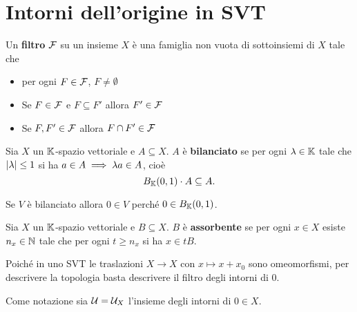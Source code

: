 \section{Intorni dell'origine in SVT}

\begin{definition}[Filtro]
Un \textbf{filtro} $\mathcal{F}$ su un insieme $X$ \`e una famiglia non vuota di sottoinsiemi di $X$ tale che
\begin{itemize}
    \item per ogni $F\in\mathcal{F}$, $F\neq \emptyset$
    \item Se $F\in \mathcal{F}$ e $F\subseteq F'$ allora $F'\in\mathcal{F}$
    \item Se $F,F'\in\mathcal{F}$ allora $F\cap F'\in\mathcal{F}$
\end{itemize}
\end{definition}

\begin{definition}
Sia $X$ un $\mathbb{K}$-spazio vettoriale e $A\subseteq X$. $A$ \`e \textbf{bilanciato} se per ogni $\lambda\in\mathbb{K}$ tale che $\left|{\lambda}\right|\leq1$ si ha $a\in A\implies \lambda a\in A$, cio\`e 
\[B_{\mathbb{K}}(0,1)\cdot A\subseteq A.\]
\end{definition}

\begin{remark}
Se $V$ \`e bilanciato allora $0\in V$ perch\'e $0\in B_{\mathbb{K}}(0,1)$.
\end{remark}

\begin{definition}
Sia $X$ un $\mathbb{K}$-spazio vettoriale e $B\subseteq X$. $B$ \`e \textbf{assorbente} se per ogni $x\in X$ esiste $n_x\in\mathbb{N}$ tale che per ogni $t\geq n_x$ si ha $x\in tB$.
\end{definition}


\begin{remark}
Poich\'e in uno SVT le traslazioni $X\to X$ con $x\mapsto x+x_0$ sono omeomorfismi, per descrivere la topologia basta descrivere il filtro degli intorni di $0$.
\end{remark}



Come notazione sia $\mathcal{U}=\mathcal{U}_X$ l'insieme degli intorni di $0\in X$.

